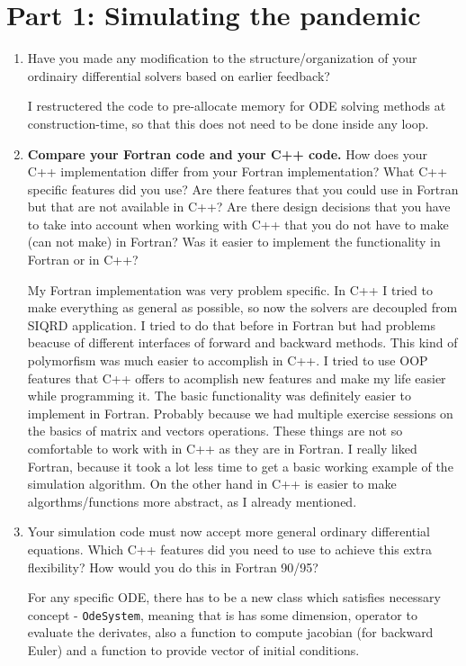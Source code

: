 \documentclass[a4paper]{article}
\newcommand{\answer}[1]{\vspace{-0.75em}\begin{framed} #1 \end{framed}\vspace{-0.75em}}
\begin{document}
\section*{Part 1: Simulating the pandemic}
\begin{enumerate}
	\item Have you made any modification to the structure/organization of your ordinairy differential solvers based on earlier feedback?
	\answer{
	I restructered the code to pre-allocate memory for ODE solving methods at construction-time, so that this does not need to be done inside any loop.
}
	\item \textbf{Compare your Fortran code and your C++ code.} How does your C++ implementation differ from your Fortran implementation? What C++ specific features did you use? Are there features that you could use in Fortran but that are not available in C++? Are there design decisions that you have to take into account when working with C++ that you do not have to make (can not make) in Fortran? Was it easier to implement the functionality in Fortran or in C++?
	\answer{
	My Fortran implementation was very problem specific. In C++ I tried to make everything as general as possible, so now the solvers are decoupled from SIQRD application. I tried to do that before in Fortran but had problems beacuse of different interfaces of forward and backward methods. This kind of polymorfism was much easier to accomplish in C++. I tried to use OOP features that C++ offers to acomplish new features and make my life easier while programming it. The basic functionality was definitely easier to implement in Fortran. Probably because we had multiple exercise sessions on the basics of matrix and vectors operations. These things are not so comfortable to work with in C++ as they are in Fortran. I really liked Fortran, because it took a lot less time to get a basic working example of the simulation algorithm. On the other hand in C++ is easier to make algorthms/functions more abstract, as I already mentioned. 
}
	\item Your simulation code must now accept more general ordinary differential equations. Which C++ features did you need to use to achieve this extra flexibility? How would you do this in Fortran 90/95?
	\answer{
		For any specific ODE, there has to be a new class which satisfies necessary concept - \texttt{OdeSystem}, meaning that is has some dimension, operator to evaluate the derivates, also a function to compute jacobian (for backward Euler) and a function to provide vector of initial conditions. 
		
}
\end{enumerate}
\end{document}
